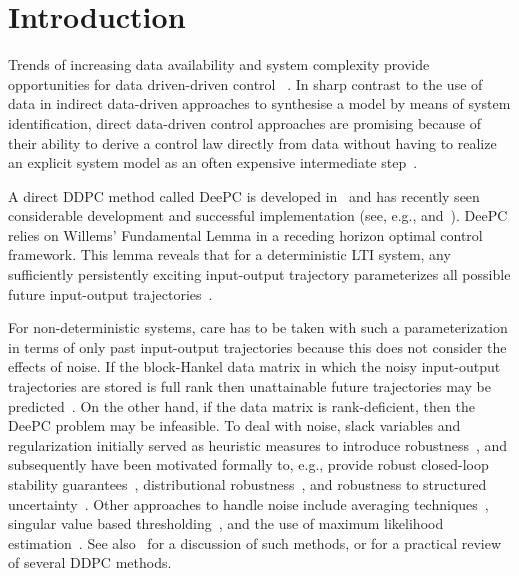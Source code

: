 \section{Introduction}\label{sec:introduction}
\noindent Trends of increasing data availability and system complexity provide opportunities for data driven-driven control%
~\citep{Hou2013}. %
In sharp contrast to the use of data in %
indirect data-driven approaches to synthesise a model by means of system identification, direct data-driven control approaches are promising because of their ability to derive a control law directly from data without having to realize an explicit system model as an often expensive intermediate step~\citep{Hjalmarsson2005}.

A direct \ac{DDPC} method called \acf{DeePC} is developed in~\cite{Coulson2019} and has recently seen considerable development and successful implementation (see, e.g., \citet{Markovsky2023} and~\citet{Breschi2023a}). \ac{DeePC} relies on Willems' Fundamental Lemma in a receding horizon optimal control framework. This lemma reveals that for a deterministic \ac{LTI} system, any sufficiently persistently exciting input-output trajectory parameterizes all possible future input-output trajectories~\citep{Willems2005}.

For non-deterministic systems, care has to be taken with such a parameterization in terms of only past input-output trajectories because this does not consider the effects of noise. If the block-Hankel data matrix in which the noisy input-output trajectories are stored is full rank then unattainable future trajectories may be predicted~\citep{Markovsky2023}. On the other hand, if the data matrix is rank-deficient, then the \ac{DeePC} problem may be infeasible. To deal with noise, slack variables and regularization initially served as heuristic measures to introduce robustness~\citep{Coulson2019}, and subsequently have been motivated formally to, e.g., provide robust closed-loop stability guarantees~\citep{Berberich2021}, distributional robustness~\citep{Coulson2019a}, and robustness to structured uncertainty~\citep{Huang2023}. Other approaches to handle noise include averaging techniques~\citep{Sassella2022a}, %
singular value based thresholding~\citep{Sassella2022}, 
and the use of maximum likelihood estimation~\citep{Yin2023}. See also~\cite{Sassella2023} for a discussion of such methods, or \cite{Verheijen2023} for a practical review of several \ac{DDPC} methods.

